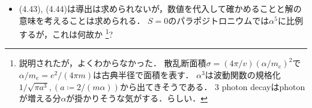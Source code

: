 \begin{itemize}
		\item (4.43), (4.44)は導出は求められないが，数値を代入して確かめることと解の意味を考えることは求められる．
		$S=0 $のパラポジトロニウムでは$\alpha^5 $に比例するが，これは何故か
		\footnote{
				説明されたが，よくわからなかった．
				散乱断面積$\sigma = (4\pi/v)(\alpha/m_{e})^2$で$\alpha/m_e = e^2/(4\pi m) $は古典半径で面積を表す．
				$\alpha^3 $は波動関数の規格化$1/\sqrt{\pi a^3}, (a\coloneqq 2/(m\alpha)) $から出てきそうである．
				3 photon decayはphotonが増える分$\alpha $が掛かりそうな気がする．らしい．
		}?
\end{itemize}
